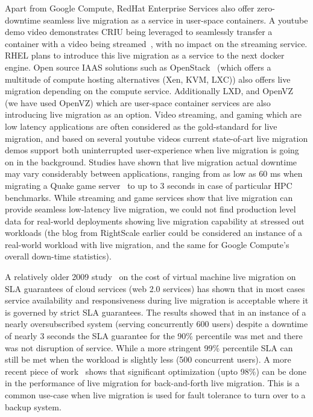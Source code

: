 Apart from Google Compute, RedHat Enterprise Services also offer zero-downtime seamless live migration as a service in user-space containers. A youtube demo video demonstrates CRIU being leveraged to seamlessly transfer a container with a video being streamed~\cite{criulive}, with no impact on the streaming service. RHEL plans to introduce this live migration as a service to the next docker engine.
Open source IAAS solutions such as OpenStack~\cite{openstack} (which offers a multitude of compute hosting alternatives (Xen, KVM, LXC)) also offers live migration depending on the compute service. Additionally LXD, and OpenVZ (we have used OpenVZ) which are user-space container services are also introducing live migration as an option. 
Video streaming, and gaming which are low latency applications are often considered as the gold-standard for live migration, and based on several youtube videos current state-of-art live migration demos support both uninterrupted user-experience when live migration is going on in the background. 
Studies have shown that live migration actual downtime may vary considerably between applications, ranging from as low as 60 ms when migrating a Quake game server~\cite{quakeGame} to up to 3 seconds in case of particular HPC benchmarks. 
While streaming and game services show that live migration can provide seamless low-latency live migration, we could not find production level data for real-world deployments showing live migration capability at stressed out workloads (the blog from RightScale earlier could be considered an instance of a real-world workload with live migration, and the same for Google Compute's overall down-time statistics).

A relatively older 2009 study~\cite{slacost} on the cost of virtual machine live migration on SLA guarantees of cloud services (web 2.0 services) has shown that in most cases service availability and responsiveness during live migration is acceptable where it is governed by strict SLA guarantees. The results showed that in an instance of a nearly oversubscribed system (serving concurrently 600 users) despite a downtime of nearly 3 seconds the SLA guarantee for the 90\% percentile was met and there was not disruption of service. While a more stringent 99\% percentile SLA can still be met when the workload is slightly less (500 concurrent users).
 A more recent piece of work~\cite{backforth} shows that significant optimization (upto 98\%) can be done in the performance of live migration for back-and-forth live migration. This is a common use-case when live migration is used for fault tolerance to turn over to a backup system. 

